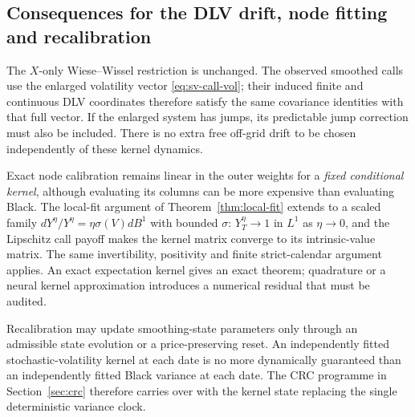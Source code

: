 \documentclass[11pt,a4paper]{article}
\numberwithin{equation}{section}
\theoremstyle{definition}\newtheorem{definition}[theorem]{Definition}
\theoremstyle{remark}\newtheorem{remark}[theorem]{Remark}
\begin{document}
\subsection{Consequences for the DLV drift, node fitting and recalibration}
The $X$-only Wiese--Wissel restriction is unchanged. The observed smoothed calls use the enlarged volatility vector \eqref{eq:sv-call-vol}; their induced finite and continuous DLV coordinates therefore satisfy the same covariance identities with that full vector. If the enlarged system has jumps, its predictable jump correction must also be included. There is no extra free off-grid drift to be chosen independently of these kernel dynamics.

Exact node calibration remains linear in the outer weights for a \emph{fixed conditional kernel}, although evaluating its columns can be more expensive than evaluating Black. The local-fit argument of Theorem~\ref{thm:local-fit} extends to a scaled family $dY^\eta/Y^\eta=\eta\sigma(V)dB^1$ with bounded $\sigma$: $Y_T^\eta\to1$ in $L^1$ as $\eta\to0$, and the Lipschitz call payoff makes the kernel matrix converge to its intrinsic-value matrix. The same invertibility, positivity and finite strict-calendar argument applies. An exact expectation kernel gives an exact theorem; quadrature or a neural kernel approximation introduces a numerical residual that must be audited.

Recalibration may update smoothing-state parameters only through an admissible state evolution or a price-preserving reset. An independently fitted stochastic-volatility kernel at each date is no more dynamically guaranteed than an independently fitted Black variance at each date. The CRC programme in Section~\ref{sec:crc} therefore carries over with the kernel state replacing the single deterministic variance clock.
\end{document}
